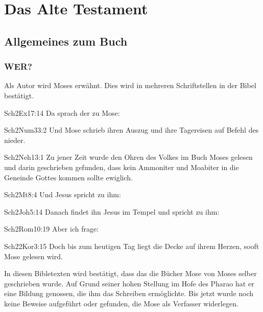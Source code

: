 \chapter{Das Alte Testament}
\section{Allgemeines zum Buch}
\subsection{WER?}
Als Autor wird Moses erwähnt. Dies wird in mehreren Schriftstellen in der Bibel bestätigt.
\begin{bibeltext}{Sch2}{Ex}{17:14}
	Da sprach der \herr{} zu Mose: 
\end{bibeltext}
\begin{bibeltext}{Sch2}{Num}{33:2}
    Und Mose schrieb ihren Auszug und ihre Tagereisen auf Befehl des \herr{} nieder.
\end{bibeltext}

\begin{bibeltext}{Sch2}{Neh}{13:1}
    Zu jener Zeit wurde den Ohren des Volkes im Buch Moses gelesen und darin geschrieben gefunden, dass kein Ammoniter und Moabiter in die Geneinde Gottes kommen sollte ewiglich.
\end{bibeltext}
\begin{bibeltext}{Sch2}{Mt}{8:4}
    Und Jesus spricht zu ihm: 
\end{bibeltext}
\begin{bibeltext}{Sch2}{Joh}{5:14}
    Danach findet ihn Jesus im Tempel und spricht zu ihm: 
\end{bibeltext}
\begin{bibeltext}{Sch2}{Rom}{10:19}
    Aber ich frage: 
\end{bibeltext}
\begin{bibeltext}{Sch2}{2Kor}{3:15}
   Doch bis zum heutigen Tag liegt die Decke auf ihrem Herzen, sooft Mose gelesen wird. 
\end{bibeltext}
In diesen Bibletexten wird bestätigt, dass das die Bücher Mose von Moses selber geschrieben wurde. Auf Grund seiner hohen Stellung im Hofe des Pharao hat er eine Bildung genossen, die ihm das Schreiben ermöglichte. Bis jetzt wurde noch keine Beweise aufgeführt oder gefunden, die Mose als Verfasser widerlegen.
